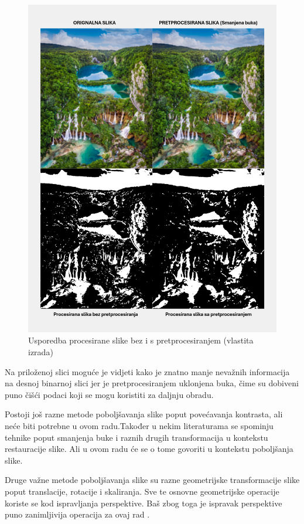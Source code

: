 \documentclass{foi}
\begin{document}
\begin{figure}[H] 
    \centering 
    \includegraphics[width=0.85\linewidth]{slike/withAndWithoutPreProcessing.png} 
    \caption{Usporedba procesirane slike bez i s pretprocesiranjem (vlastita izrada)} 
\end{figure}

Na priloženoj slici moguće je vidjeti kako je znatno manje nevažnih informacija na desnoj binarnoj slici jer je pretprocesiranjem uklonjena buka, čime su dobiveni puno čišći podaci koji se mogu koristiti za daljnju obradu.

Postoji još razne metode poboljšavanja slike poput povećavanja kontrasta, ali neće biti potrebne u ovom radu.Također u nekim literaturama se spominju tehnike poput smanjenja buke  i raznih drugih transformacija u kontekstu restauracije slike. Ali u ovom radu će se o tome govoriti u kontekstu poboljšanja slike.

Druge važne metode poboljšavanja slike su razne geometrijske transformacije slike poput translacije, rotacije i skaliranja. Sve te osnovne geometrijske operacije koriste se kod ispravljanja perspektive. Baš zbog toga je ispravak perspektive puno zanimljivija operacija za ovaj rad \cite{GeometryTransforms}.
\end{document}
